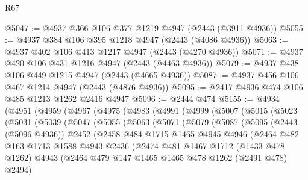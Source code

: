 \begin{lexlean}{R67}
\begin{coremodule}
@5047 := @4937 @366 @106 @377 @1219 @4947 (@2443 (@3911 @4936))
@5055 := @4937 @384 @106 @395 @1218 @4947 (@2443 (@4086 @4936))
@5063 := @4937 @402 @106 @413 @1217 @4947 (@2443 (@4270 @4936))
@5071 := @4937 @420 @106 @431 @1216 @4947 (@2443 (@4463 @4936))
@5079 := @4937 @438 @106 @449 @1215 @4947 (@2443 (@4665 @4936))
@5087 := @4937 @456 @106 @467 @1214 @4947 (@2443 (@4876 @4936))
@5095 := @2417 @4936 @474 @106 @485 @1213 @1262 @2416 @4947
@5096 := @2444 @474
@5155 := @4934
    (@4951
      (@4959
        (@4967
          (@4975
            (@4983
              (@4991
                (@4999
                  (@5007
                    (@5015
                      (@5023
                        (@5031
                          (@5039
                            (@5047
                              (@5055
                                (@5063
                                  (@5071
                                    (@5079
                                      (@5087
                                        (@5095
                                          (@2443 (@5096 @4936))
                                          @2452
                                          (@2458
                                            @484
                                            @1715
                                            @1465
                                            @4945
                                            @4946
                                            (@2464
                                              @482
                                              @163
                                              @1713
                                              @1588
                                              @4943
                                              @2436
                                              (@2474
                                                @481
                                                @1467
                                                @1712
                                                (@1433 @478 @1262)
                                                @4943
                                                (@2464
                                                  @479
                                                  @147
                                                  @1465
                                                  @1465
                                                  @478
                                                  @1262
                                                  (@2491 @478)
                                                  @2494)

\end{coremodule}
\end{lexlean}
